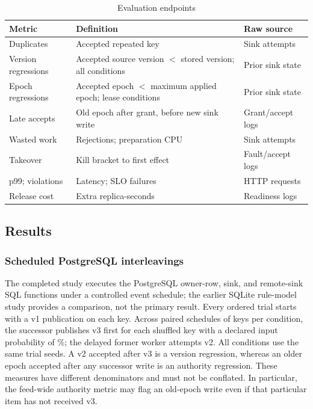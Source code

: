\documentclass[conference,10pt]{IEEEtran}
\begin{document}
\begin{table}[t]\caption{Evaluation endpoints}\label{tab:metrics}
\centering\footnotesize
\begin{tabularx}{\columnwidth}{p{.80in}YY}\toprule
Metric & Definition & Raw source\\\midrule
Duplicates & Accepted repeated key & Sink attempts\\
Version regressions & Accepted source version $<$ stored version; all conditions & Prior sink state\\
Epoch regressions & Accepted epoch $<$ maximum applied epoch; lease conditions & Prior sink state\\
Late accepts & Old epoch after grant, before new sink write & Grant/accept logs\\
Wasted work & Rejections; preparation CPU & Sink attempts\\
Takeover & Kill bracket to first effect & Fault/accept logs\\
p99; violations & Latency; SLO failures & HTTP requests\\
Release cost & Extra replica-seconds & Readiness logs\\\bottomrule
\end{tabularx}
\end{table}

\subsection{Results}

\subsubsection{Scheduled PostgreSQL interleavings}
The completed study executes the PostgreSQL owner-row, sink, and remote-sink SQL functions under a controlled event schedule; the earlier SQLite rule-model study provides a comparison, not the primary result. Every ordered trial starts with a v1 publication on each key. Across \ObsOrderedRuns{} paired schedules of \ObsKeys{} keys per condition, the successor publishes v3 first for each shuffled key with a declared input probability of \ObsFirstProbabilityPct\%; the delayed former worker attempts v2. All conditions use the same trial seeds. A v2 accepted after v3 is a version regression, whereas an older epoch accepted after any successor write is an authority regression. These measures have different denominators and must not be conflated. In particular, the feed-wide authority metric may flag an old-epoch write even if that particular item has not received v3.
\end{document}
